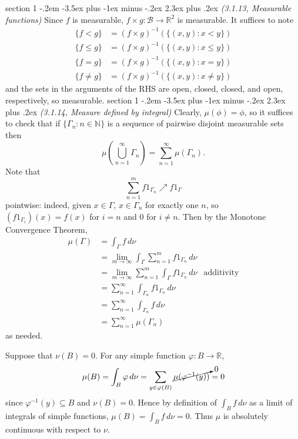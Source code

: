 \documentclass[12pt]{article}
\makeatletter
\theoremstyle{norm}
\newcommand{\N}[0]{\mathbb{N}}
\newcommand{\R}[0]{\mathbb{R}}
\providecommand{\cal}[1]{\mathcal{#1}}
\renewcommand{\cal}[1]{\mathcal{#1}}
\newcommand{\subeq}[0]{\subseteq}
\newcommand{\Ga}[0]{\Gamma}
\newcommand{\ph}[0]{\varphi}
\newcommand{\pa}[1]{\left( {#1} \right)}
\newcommand{\bs}[0]{\backslash}
\newcommand{\iy}[0]{\infty}
\newenvironment{problem}{\@startsection
       {section}
       {1}
       {-.2em}
       {-3.5ex plus -1ex minus -.2ex}
       {2.3ex plus .2ex}
       {\pagebreak[3]%
       \large\bf\noindent{Problem }
       }
       }
       {%
       }
\makeatother
\begin{document}
\begin{problem}{\it (3.1.13, Measurable functions)}
Since $f$ is measurable, $f\times g:\cal B\to \R^2$ is measurable. It suffices to note
\begin{align*}
\{f<g\}&=(f\times g)^{-1}(\{(x,y):x<y\})\\
\{f\le g\}&=(f\times g)^{-1}(\{(x,y):x\le y\})\\
\{f= g\}&=(f\times g)^{-1}(\{(x,y):x= y\})\\
\{f\ne g\}&=(f\times g)^{-1}(\{(x,y):x\ne y\})
\end{align*}
and the sets in the arguments of the RHS are open, closed, closed, and open, respectively, so measurable.
\end{problem}
\begin{problem}{\it (3.1.14, Measure defined by integral)}
Clearly, $\mu(\phi)=\phi$, so it suffices to check that if $\{\Ga_n:n\in \N\}$ is a sequence of pairwise disjoint measurable sets then
\[
\mu\pa{\bigcup_{n=1}^{\iy} \Ga_n}
=\sum_{n=1}^{\iy} \mu(\Ga_n).
\]
Note that
\[
\sum_{n=1}^m f1_{\Ga_n}\nearrow f1_{\Ga}
\]
pointwise: indeed, given $x\in \Ga$, $x\in \Ga_{n}$ for exactly one $n$, so $(f1_{\Ga_i})(x)=f(x)$ for $i=n$ and $0$ for $i\neq n$. Then by the Monotone Convergence Theorem,
\begin{align*}
\mu(\Ga)&=\int_{\Ga} f\,d\nu\\
&=\lim_{m\to \iy} \int_{\Ga}\sum_{n=1}^m f1_{\Ga_n}\,d\nu\\
&=\lim_{m\to \iy} \sum_{n=1}^m \int_{\Ga} f1_{\Ga_n}\,d\nu&\text{additivity}\\
&=\sum_{n=1}^{\iy} \int_{\Ga_n} f1_{\Ga_n}\,d\nu\\
&=\sum_{n=1}^{\iy} \int_{\Ga_n} f\,d\nu\\
&=\sum_{n=1}^{\iy} \mu(\Ga_n)
\end{align*}
as needed.

Suppose that $\nu(B)=0$. For any simple function $\ph:B\to \R$,
\[
\mu(B)=\int_B \ph\,d\nu=\sum_{y\in \ph(B)} \cancelto{0}{\mu(\ph^{-1}(y))}=0
\]
since $\ph^{-1}(y)\subeq B$ and $\nu(B)=0$.
Hence by definition of $\int_B f\,d\nu$ as a limit of integrals of simple functions, $\mu(B)=\int_Bf\,d\nu=0$. 
Thus $\mu$ is absolutely continuous with respect to $\nu$.
\end{problem}
\end{document}
